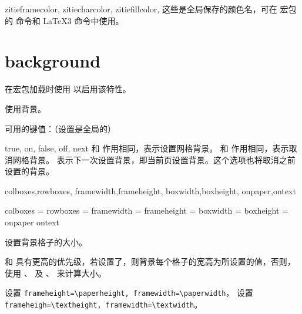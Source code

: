 \documentclass{ctxdoc}
\begin{document}
\begin{function}{
  zitieframecolor,
  zitiecharcolor,
  zitiefillcolor,
}
  这些是全局保存的颜色名，可在  宏包的  命令和 \LaTeX3  命令中使用。
\end{function}


\section{background}\label{sec:background}

在宏包加载时使用  以启用该特性。

\begin{function}{\zitiebackground}
  \begin{syntax}
     
  \end{syntax}
  使用背景。
\end{function}

 可用的键值：（设置是全局的）

\begin{function}{true, on, false, off, next}
   和  作用相同，表示设置网格背景。
   和  作用相同，表示取消网格背景。
   表示下一次设置背景，即当前页设置背景。这个选项也将取消之前设置的背景。
\end{function}

\begin{function}{
  colboxes,rowboxes,
  framewidth,frameheight,
  boxwidth,boxheight,
  onpaper,ontext
}
  \begin{syntax}
    colboxes    =  
    rowboxes    =  
    framewidth  = 
    frameheight = 
    boxwidth    = 
    boxheight   = 
    onpaper
    ontext
  \end{syntax}
  设置背景格子的大小。

   和  具有更高的优先级，若设置了，则背景每个格子的宽高为所设置的值，否则，使用 、 及 、 来计算大小。

   设置 \verb|frameheight=\paperheight, framewidth=\paperwidth|，
   设置 \verb|frameheigh=\textheight, framewidth=\textwidth|。
\end{function}
\end{document}
